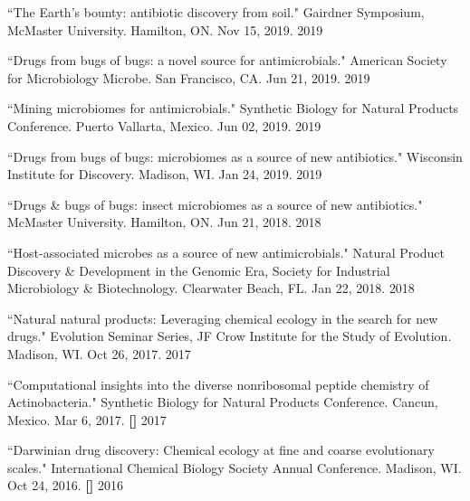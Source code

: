 \begin{cvpubs}

\cvpub
{``The Earth’s bounty: antibiotic discovery from soil." Gairdner Symposium, McMaster University. Hamilton, ON. Nov 15, 2019.}
{2019}

\cvpub
{``Drugs from bugs of bugs: a novel source for antimicrobials." American Society for Microbiology Microbe. San Francisco, CA. Jun 21, 2019.}
{2019}

\cvpub
{``Mining microbiomes for antimicrobials." Synthetic Biology for Natural Products Conference. Puerto Vallarta, Mexico. Jun 02, 2019.}
{2019}

\cvpub
{``Drugs from bugs of bugs: microbiomes as a source of new antibiotics." Wisconsin Institute for Discovery. Madison, WI. Jan 24, 2019.}
{2019}

\cvpub
{``Drugs \& bugs of bugs: insect microbiomes as a source of new antibiotics."  McMaster University. Hamilton, ON. Jun 21, 2018.}
{2018}

\cvpub
{``Host-associated microbes as a source of new antimicrobials." Natural Product Discovery \& Development in the Genomic Era, Society for Industrial Microbiology \& Biotechnology. Clearwater Beach, FL. Jan 22, 2018.}
{2018}

\cvpub
{``Natural natural products: Leveraging chemical ecology in the search for new drugs." Evolution Seminar Series, JF Crow Institute for the Study of Evolution. Madison, WI. Oct 26, 2017.}
{2017}

\cvpub
{``Computational insights into the diverse nonribosomal peptide chemistry of Actinobacteria." Synthetic Biology for Natural Products Conference. Cancun, Mexico. Mar 6, 2017. \linebreak \textbf{[\textit{}]}}
{2017}

\cvpub
{``Darwinian drug discovery: Chemical ecology at fine and coarse evolutionary scales." International Chemical Biology Society Annual Conference. Madison, WI. Oct 24, 2016. \linebreak \textbf{[\textit{}]}}
{2016}

\end{cvpubs}


